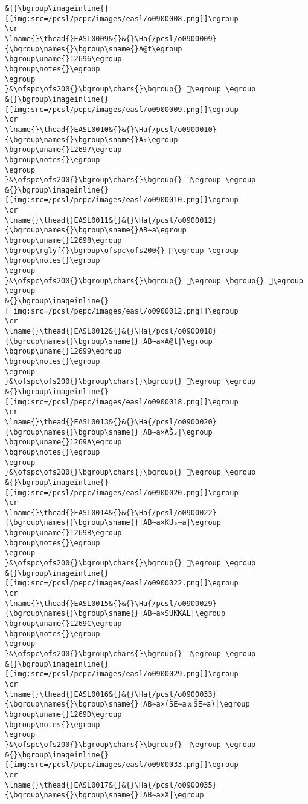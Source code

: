 \begin{verbatim}
&{}\bgroup\imageinline{}[[img:src=/pcsl/pepc/images/easl/o0900008.png]]\egroup
\cr
\lname{}\thead{}EASL0009&{}&{}\Ha{/pcsl/o0900009}{\bgroup\names{}\bgroup\sname{}A@t\egroup
\bgroup\uname{}12696\egroup
\bgroup\notes{}\egroup
\egroup
}&\ofspc\ofs200{}\bgroup\chars{}\bgroup{} 𒚖\egroup \egroup
&{}\bgroup\imageinline{}[[img:src=/pcsl/pepc/images/easl/o0900009.png]]\egroup
\cr
\lname{}\thead{}EASL0010&{}&{}\Ha{/pcsl/o0900010}{\bgroup\names{}\bgroup\sname{}A₂\egroup
\bgroup\uname{}12697\egroup
\bgroup\notes{}\egroup
\egroup
}&\ofspc\ofs200{}\bgroup\chars{}\bgroup{} 𒚗\egroup \egroup
&{}\bgroup\imageinline{}[[img:src=/pcsl/pepc/images/easl/o0900010.png]]\egroup
\cr
\lname{}\thead{}EASL0011&{}&{}\Ha{/pcsl/o0900012}{\bgroup\names{}\bgroup\sname{}AB∼a\egroup
\bgroup\uname{}12698\egroup
\bgroup\rglyf{}\bgroup\ofspc\ofs200{} 𒚘\egroup \egroup
\bgroup\notes{}\egroup
\egroup
}&\ofspc\ofs200{}\bgroup\chars{}\bgroup{} 𒚢\egroup \bgroup{} 𒚘\egroup \egroup
&{}\bgroup\imageinline{}[[img:src=/pcsl/pepc/images/easl/o0900012.png]]\egroup
\cr
\lname{}\thead{}EASL0012&{}&{}\Ha{/pcsl/o0900018}{\bgroup\names{}\bgroup\sname{}|AB∼a×A@t|\egroup
\bgroup\uname{}12699\egroup
\bgroup\notes{}\egroup
\egroup
}&\ofspc\ofs200{}\bgroup\chars{}\bgroup{} 𒚙\egroup \egroup
&{}\bgroup\imageinline{}[[img:src=/pcsl/pepc/images/easl/o0900018.png]]\egroup
\cr
\lname{}\thead{}EASL0013&{}&{}\Ha{/pcsl/o0900020}{\bgroup\names{}\bgroup\sname{}|AB∼a×AŠ₂|\egroup
\bgroup\uname{}1269A\egroup
\bgroup\notes{}\egroup
\egroup
}&\ofspc\ofs200{}\bgroup\chars{}\bgroup{} 𒚚\egroup \egroup
&{}\bgroup\imageinline{}[[img:src=/pcsl/pepc/images/easl/o0900020.png]]\egroup
\cr
\lname{}\thead{}EASL0014&{}&{}\Ha{/pcsl/o0900022}{\bgroup\names{}\bgroup\sname{}|AB∼a×KU₆∼a|\egroup
\bgroup\uname{}1269B\egroup
\bgroup\notes{}\egroup
\egroup
}&\ofspc\ofs200{}\bgroup\chars{}\bgroup{} 𒚛\egroup \egroup
&{}\bgroup\imageinline{}[[img:src=/pcsl/pepc/images/easl/o0900022.png]]\egroup
\cr
\lname{}\thead{}EASL0015&{}&{}\Ha{/pcsl/o0900029}{\bgroup\names{}\bgroup\sname{}|AB∼a×SUKKAL|\egroup
\bgroup\uname{}1269C\egroup
\bgroup\notes{}\egroup
\egroup
}&\ofspc\ofs200{}\bgroup\chars{}\bgroup{} 𒚜\egroup \egroup
&{}\bgroup\imageinline{}[[img:src=/pcsl/pepc/images/easl/o0900029.png]]\egroup
\cr
\lname{}\thead{}EASL0016&{}&{}\Ha{/pcsl/o0900033}{\bgroup\names{}\bgroup\sname{}|AB∼a×(ŠE∼a﹠ŠE∼a)|\egroup
\bgroup\uname{}1269D\egroup
\bgroup\notes{}\egroup
\egroup
}&\ofspc\ofs200{}\bgroup\chars{}\bgroup{} 𒚝\egroup \egroup
&{}\bgroup\imageinline{}[[img:src=/pcsl/pepc/images/easl/o0900033.png]]\egroup
\cr
\lname{}\thead{}EASL0017&{}&{}\Ha{/pcsl/o0900035}{\bgroup\names{}\bgroup\sname{}|AB∼a×X|\egroup

\end{verbatim}
